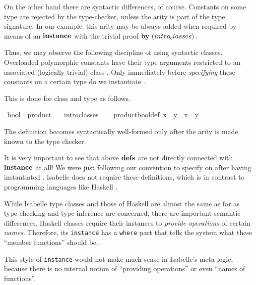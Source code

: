\begin{isabellebody}
\begin{isamarkuptext}
 On the other hand there are syntactic differences, of course.
 Constants \isa{{\isasymodot}} on some type \isa{{\isasymtau}} are rejected by the
 type-checker, unless the arity  is part of the
 type signature.  In our example, this arity may be always added when
 required by means of an ${\mathord{\mathbf{instance}}}$ with the trivial proof
 $\BY{intro_classes}$.

 \medskip Thus, we may observe the following discipline of using
 syntactic classes.  Overloaded polymorphic constants have their type
 arguments restricted to an associated (logically trivial) class
 .  Only immediately before \emph{specifying} these constants
 on a certain type \isa{{\isasymtau}} do we instantiate .

 This is done for class  and type  as
 follows.%
\end{isamarkuptext}%
\ bool\ {\isacharcolon}{\isacharcolon}\ product\isanewline
\ \ \ intro{\isacharunderscore}classes\isanewline
{}\ {\isacharparenleft}\isanewline
\ \ product{\isacharunderscore}bool{\isacharunderscore}def{\isacharcolon}\ {\isachardoublequote}x\ {\isasymodot}\ y\ {\isasymequiv}\ x\ {\isasymand}\ y{\isachardoublequote}%
\begin{isamarkuptext}%
The definition  becomes syntactically
 well-formed only after the arity  is made
 known to the type checker.

 \medskip It is very important to see that above ${\mathord{\mathbf{defs}}}$ are not
 directly connected with ${\mathord{\mathbf{instance}}}$ at all!  We were just following
 our convention to specify \isa{{\isasymodot}} on  after having
 instantiated .  Isabelle does not require
 these definitions, which is in contrast to programming languages like
 Haskell \cite{haskell-report}.

 \medskip While Isabelle type classes and those of Haskell are almost
 the same as far as type-checking and type inference are concerned,
 there are important semantic differences.  Haskell classes require
 their instances to \emph{provide operations} of certain \emph{names}.
 Therefore, its \texttt{instance} has a \texttt{where} part that tells
 the system what these ``member functions'' should be.

 This style of \texttt{instance} would not make much sense in
 Isabelle's meta-logic, because there is no internal notion of
 ``providing operations'' or even ``names of functions''.%
\end{isamarkuptext}%
\end{isabellebody}%
